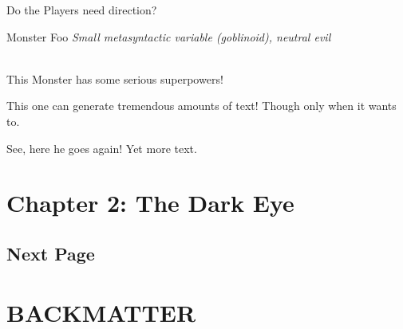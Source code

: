 \documentclass[10pt,%
	a4paper,%
	twoside,%
	twocolumn,%
	openany%
	]{book}
\begin{document}
\begin{paperbox}{Do the Players need direction?}
	\lipsum[1]
\end{paperbox}

\begin{monsterbox}{Monster Foo}
	\textit{Small metasyntactic variable (goblinoid), neutral evil}\\
	\hline
	\basics[%
	armorclass = 12,
	hitpoints  = 16 (3d8 + 3),
	speed      = 50 ft
	]
	\hline
	\stats[
    STR = \stat{12}, %
    DEX = \stat{7}
	]
	\hline
	\details[%
	languages = {Common Lisp, Erlang},
	]
	\hline \\[1mm]
	\begin{monsteraction}
		This Monster has some serious superpowers!
	\end{monsteraction}
	\begin{monsteraction}
		This one can generate tremendous amounts of text! Though only when it wants to.
	\end{monsteraction}

	\begin{monsteraction}
    See, here he goes again! Yet more text.
	\end{monsteraction}
\end{monsterbox}

\chapter{Chapter 2: The Dark Eye}

\section{Next Page}
\lipsum[1] %

\pagebreak

\lipsum[1] %

\pagebreak

\lipsum[1] %

\pagebreak

\lipsum[1] %

\pagebreak

\lipsum[1] %

\pagebreak

\lipsum[1] %

\backmatter

\chapter{BACKMATTER}

\lipsum[1] %

\lastpagebackgroundimg

\end{document}
